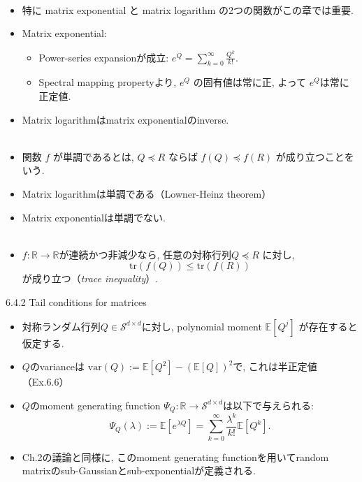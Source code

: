 \documentclass[unicode,aspectratio=169,11pt]{beamer}
\newcommand{\ex}{\mathbb{E}}
\newcommand{\var}{\mathrm{var}}
\newcommand{\bb}{\mathbb}
\newcommand{\cc}{\mathcal}
\newcommand{\trace}{\mathrm{tr}}
\begin{document}
\begin{frame}
  　\\
  \begin{itemize}
    \item 特に matrix exponential と matrix logarithm の2つの関数がこの章では重要.
    \item Matrix exponential:
    \begin{itemize}
      \item Power-series expansionが成立: $e^Q = \sum_{k = 0}^\infty \frac{Q^k}{k!}$.
      \item Spectral mapping propertyより, $e^Q$ の固有値は常に正, よって $e^Q$は常に正定値.
    \end{itemize}
    \item Matrix logarithmはmatrix exponentialのinverse.\\
    　\\
    \item 関数 $f$ が単調であるとは, $Q \preceq R$ ならば $f(Q) \preceq f(R)$ が成り立つことをいう.
    \item Matrix logarithmは単調である（Lowner-Heinz theorem）
    \item Matrix exponentialは単調でない.\\
    　\\
    \item $f : \bb{R} \to \bb{R}$が連続かつ非減少なら, 任意の対称行列$Q \preceq R$ に対し,
          \[ \trace(f(Q)) \le \trace(f(R)) \tag{6,25}\]
          が成り立つ（{\it trace inequality}）.
  \end{itemize}
\end{frame}

\begin{frame}{6.4.2 Tail conditions for matrices}{}
  \begin{itemize}
    \item 対称ランダム行列$Q \in \cc{S}^{d\times d}$に対し, polynomial moment $\ex[Q^j]$ が存在すると仮定する.
    \item $Q$のvarianceは $\var(Q) := \ex[Q^2] - (\ex[Q])^2$で, これは半正定値（Ex.6.6）
    \item $Q$のmoment generating function $\Psi_Q:\bb{R} \to \cc{S}^{d\times d}$は以下で与えられる:
          \[
            \Psi_Q(\lambda) := \ex[e^{\lambda Q}] = \sum_{k=0}^\infty \frac{\lambda^k}{k!} \ex[Q^k].
            \tag{6.26}
          \]
    \item Ch.2の議論と同様に, このmoment generating functionを用いてrandom matrixのsub-Gaussianとsub-exponentialが定義される.
  \end{itemize}
\end{frame}
\end{document}
